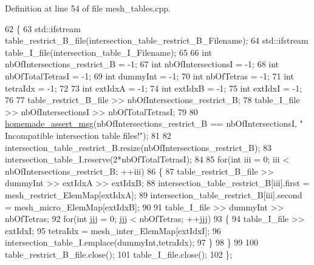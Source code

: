 Definition at line 54 of file mesh\+\_\+tables.\+cpp.


\begin{DoxyCode}
62 \{
63     std::ifstream table\_restrict\_B\_file(intersection\_table\_restrict\_B\_Filename);
64     std::ifstream table\_I\_file(intersection\_table\_I\_Filename);
65 
66     \textcolor{keywordtype}{int} nbOfIntersections\_restrict\_B = -1;
67     \textcolor{keywordtype}{int} nbOfIntersectionsI  = -1;
68     \textcolor{keywordtype}{int} nbOfTotalTetrasI  = -1;
69     \textcolor{keywordtype}{int} dummyInt = -1;
70     \textcolor{keywordtype}{int} nbOfTetras = -1;
71     \textcolor{keywordtype}{int} tetraIdx = -1;
72 
73     \textcolor{keywordtype}{int} extIdxA = -1;
74     \textcolor{keywordtype}{int} extIdxB = -1;
75     \textcolor{keywordtype}{int} extIdxI = -1;
76 
77     table\_restrict\_B\_file >> nbOfIntersections\_restrict\_B;
78     table\_I\_file >> nbOfIntersectionsI >> nbOfTotalTetrasI;
79 
80     \hyperlink{common__header_8h_a593ccc80b790b2268653fcf6597bf451}{homemade\_assert\_msg}(nbOfIntersections\_restrict\_B == nbOfIntersectionsI, \textcolor{stringliteral}{"
      Incompatible intersection table files!"});
81 
82     intersection\_table\_restrict\_B.resize(nbOfIntersections\_restrict\_B);
83     intersection\_table\_I.reserve(2*nbOfTotalTetrasI);
84 
85     \textcolor{keywordflow}{for}(\textcolor{keywordtype}{int} iii = 0; iii < nbOfIntersections\_restrict\_B; ++iii)
86     \{
87         table\_restrict\_B\_file >> dummyInt >> extIdxA >> extIdxB;
88         intersection\_table\_restrict\_B[iii].first = mesh\_restrict\_ElemMap[extIdxA];
89         intersection\_table\_restrict\_B[iii].second = mesh\_micro\_ElemMap[extIdxB];
90 
91         table\_I\_file >> dummyInt >> nbOfTetras;
92         \textcolor{keywordflow}{for}(\textcolor{keywordtype}{int} jjj = 0; jjj < nbOfTetras; ++jjj)
93         \{
94             table\_I\_file >> extIdxI;
95             tetraIdx = mesh\_inter\_ElemMap[extIdxI];
96             intersection\_table\_I.emplace(dummyInt,tetraIdx);
97         \}
98     \}
99 
100     table\_restrict\_B\_file.close();
101     table\_I\_file.close();
102 \};
\end{DoxyCode}
\hypertarget{namespacecarl_aba5c04efa5a0abae78d3efd00ae694e3}{}
